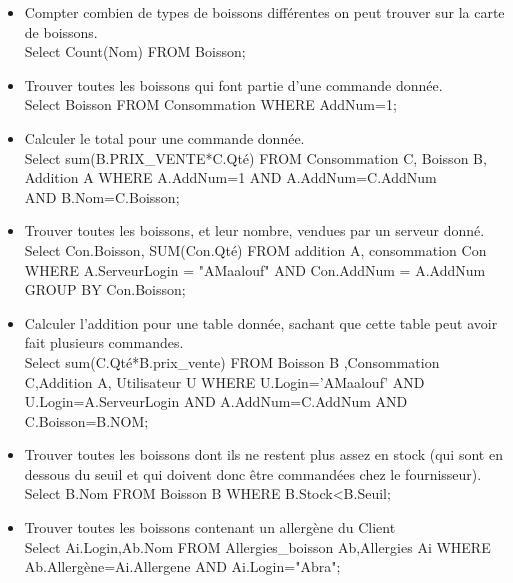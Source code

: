 \documentclass[11pt, a4, oneside, headings=normal]{scrreprt}
\begin{document}
\begin{itemize}
\item Compter combien de types de boissons différentes on peut trouver sur la carte de boissons.
\\  Select Count(Nom) FROM Boisson;
\item Trouver toutes les boissons qui font partie d’une commande donnée.
 \\ Select Boisson FROM Consommation WHERE AddNum=1;
\item Calculer le total pour une commande donnée.
 \\ Select sum(B.PRIX\_VENTE*C.Qté) FROM Consommation C, Boisson B, Addition A WHERE A.AddNum=1 AND A.AddNum=C.AddNum \\AND B.Nom=C.Boisson;
\item Trouver toutes les boissons, et leur nombre, vendues par un serveur donné.
 \\ Select Con.Boisson, SUM(Con.Qté) FROM addition A, consommation Con WHERE A.ServeurLogin = "AMaalouf" AND Con.AddNum = A.AddNum GROUP BY Con.Boisson;
\item Calculer l’addition pour une table donnée, sachant que cette table peut avoir fait plusieurs commandes.
 \\ Select sum(C.Qté*B.prix\_vente) FROM Boisson B ,Consommation C,Addition A, Utilisateur U WHERE U.Login='AMaalouf' AND U.Login=A.ServeurLogin AND A.AddNum=C.AddNum AND C.Boisson=B.NOM;
\item Trouver toutes les boissons dont ils ne restent plus assez en stock (qui sont en dessous du seuil et
qui doivent donc être commandées chez le fournisseur).
 \\ Select B.Nom FROM Boisson B WHERE B.Stock<B.Seuil;
\item Trouver toutes les boissons contenant un allergène du Client
 \\ Select Ai.Login,Ab.Nom FROM Allergies\_boisson Ab,Allergies Ai WHERE \\Ab.Allergène=Ai.Allergene AND Ai.Login="Abra";

\end{itemize}
\end{document}
